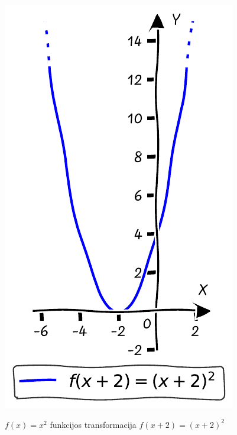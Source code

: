 \documentclass{tufte-handout}
\begin{document}
\begin{marginfigure}%

  \includegraphics[width=\linewidth]{./graphs/quadratic_func_transform_lshifted_2.pdf}
  \caption{$f(x)=x^2$ funkcijos transformacija $f(x+2)=(x+2)^2$}
  \label{fig:quadratic_func_transform_lshifted_2}
\end{marginfigure}
\end{document}
